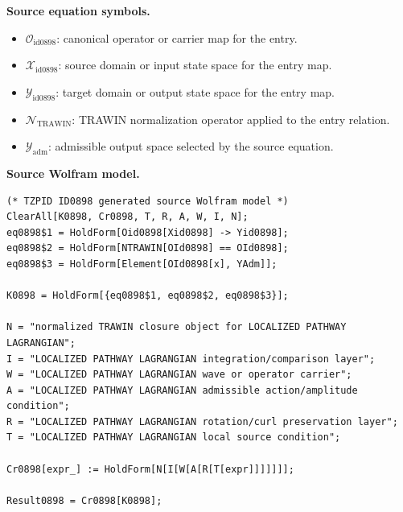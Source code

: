 \begin{minipage}[t]{0.49\linewidth}
\begingroup
\small
\raggedright
\textbf{Source equation symbols.}\par
\begin{itemize}[leftmargin=1.35em,itemsep=1pt,topsep=1pt,parsep=0pt]
    \item $\mathcal{O}_{\mathrm{id0898}}$: canonical operator or carrier map for the entry.
    \item $\mathcal{X}_{\mathrm{id0898}}$: source domain or input state space for the entry map.
    \item $\mathcal{Y}_{\mathrm{id0898}}$: target domain or output state space for the entry map.
    \item $\mathcal{N}_{\mathrm{TRAWIN}}$: TRAWIN normalization operator applied to the entry relation.
    \item $\mathcal{Y}_{\mathrm{adm}}$: admissible output space selected by the source equation.
\end{itemize}
\endgroup
\end{minipage}\hfill
\begin{minipage}[t]{0.47\linewidth}
\begingroup
\scriptsize
\raggedright
\textbf{Source Wolfram model.}\par
\begin{Verbatim}[fontsize=\tiny,breaklines=true,breakanywhere=true]
(* TZPID ID0898 generated source Wolfram model *)
ClearAll[K0898, Cr0898, T, R, A, W, I, N];
eq0898$1 = HoldForm[Oid0898[Xid0898] -> Yid0898];
eq0898$2 = HoldForm[NTRAWIN[OId0898] == OId0898];
eq0898$3 = HoldForm[Element[OId0898[x], YAdm]];

K0898 = HoldForm[{eq0898$1, eq0898$2, eq0898$3}];

N = "normalized TRAWIN closure object for LOCALIZED PATHWAY LAGRANGIAN";
I = "LOCALIZED PATHWAY LAGRANGIAN integration/comparison layer";
W = "LOCALIZED PATHWAY LAGRANGIAN wave or operator carrier";
A = "LOCALIZED PATHWAY LAGRANGIAN admissible action/amplitude condition";
R = "LOCALIZED PATHWAY LAGRANGIAN rotation/curl preservation layer";
T = "LOCALIZED PATHWAY LAGRANGIAN local source condition";

Cr0898[expr_] := HoldForm[N[I[W[A[R[T[expr]]]]]]];

Result0898 = Cr0898[K0898];
\end{Verbatim}
\endgroup
\end{minipage}

